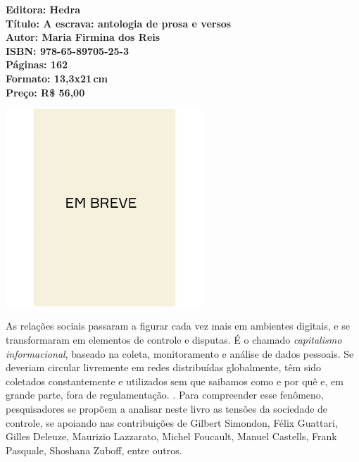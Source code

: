 \vfill
\noindent\begin{minipage}[c]{1\linewidth}
{\small\textbf{
\hspace*{-.1cm}Editora: Hedra\\
Título: A escrava: antologia de prosa e versos\\
Autor: Maria Firmina dos Reis\\ 
ISBN: 978-65-89705-25-3\\
Páginas: 162\\
Formato: 13,3x21\,cm\\
Preço: R\$ 56,00\\
}}
\end{minipage}
\pagebreak

\begin{center}
\hspace*{.5cm}\includegraphics[width=74mm]{./CAPAS/breve.jpeg}
\end{center}
\hspace*{-7cm}\hrulefill\hspace*{-7cm}
\medskip

\noindent{}As relações sociais passaram a figurar cada vez mais em ambientes digitais, e se transformaram em elementos de controle e disputas. É o chamado \textit{capitalismo informacional}, baseado na coleta, monitoramento e análise de dados pessoais. Se deveriam circular livremente em redes distribuídas globalmente, têm sido coletados constantemente e utilizados sem que saibamos como e por quê e, em grande parte, fora de regulamentação. . Para compreender esse fenômeno, pesquisadores se propõem a analisar neste livro as tensões da sociedade de controle, se apoiando nas contribuições de Gilbert Simondon, Félix Guattari, Gilles Deleuze, Maurizio Lazzarato, Michel Foucault, Manuel Castells, Frank Pasquale, Shoshana Zuboff, entre outros.

